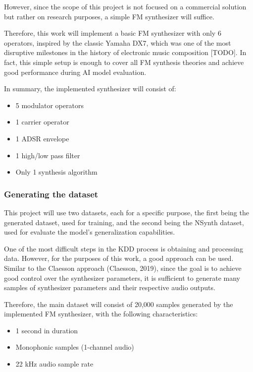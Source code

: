 \documentclass[sigconf,natbib=false]{acmart}
\begin{document}
However, since the scope of this project is not focused on a commercial solution but rather on research purposes, a simple FM synthesizer will suffice.

Therefore, this work will implement a basic FM synthesizer with only 6 operators, inspired by the classic Yamaha DX7, which was one of the most disruptive milestones in the history of electronic music composition [TODO]. In fact, this simple setup is enough to cover all FM synthesis theories and achieve good performance during AI model evaluation.

In summary, the implemented synthesizer will consist of:

\begin{itemize}
\item 5 modulator operators
\item 1 carrier operator
\item 1 ADSR envelope
\item 1 high/low pass filter
\item Only 1 synthesis algorithm
\end{itemize}

\subsubsection{Generating the dataset}

This project will use two datasets, each for a specific purpose, the first being the generated dataset, used for training, and the second being the NSynth dataset, used for evaluate the model's generalization capabilities.

One of the most difficult steps in the KDD process is obtaining and processing data. However, for the purposes of this work, a good approach can be used. Similar to the Claesson approach (Claesson, 2019), since the goal is to achieve good control over the synthesizer parameters, it is sufficient to generate many samples of synthesizer parameters and their respective audio outputs.

Therefore, the main dataset will consist of 20,000 samples generated by the implemented FM synthesizer, with the following characteristics:

\begin{itemize}
\item 1 second in duration
\item Monophonic samples (1-channel audio)
\item 22 kHz audio sample rate
\end{itemize}
\end{document}
